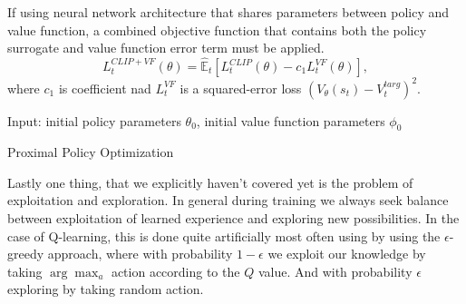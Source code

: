 If using neural network architecture that shares parameters between policy and value function, a combined objective function that contains both the policy surrogate and value function error term must be applied.
\[
  L_t^{CLIP+VF}(\theta) =   \hat{\mathbb{E}}_t \left[L_t^{CLIP}(\theta) - c_1 L_t^{VF}(\theta) \right],
\]
where $c_1$ is coefficient nad $L_t^{VF}$ is a squared-error loss $(V_\theta(s_t) - V_t^{targ})^2$.

\begin{algorithm}[]
  Input: initial policy parameters $\theta_0$, initial value function parameters $\phi_0$
  
  
  \caption{Proximal Policy Optimization}
  \label{PPO}
\end{algorithm}

\pagebreak
Lastly one thing, that we explicitly haven't covered yet is the problem of exploitation and exploration.
In general during training we always seek balance between exploitation of learned experience and exploring new possibilities.
In the case of Q-learning, this is done  quite artificially most often using by using the $\epsilon$-greedy approach, where with probability $1-\epsilon$ we exploit our knowledge by taking $\arg \max_a$ action according to the $Q$ value.
And with probability $\epsilon$ exploring by taking random action.

